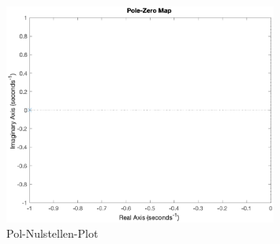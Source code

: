 \begin{figure}[H]
    \centering
    \includegraphics[width=0.8\textwidth]{Bilder/PoleZeroPT1Tt.eps}
    \caption{Pol-Nulstellen-Plot}
 \end{figure}
 \label{fig:poleZero}

